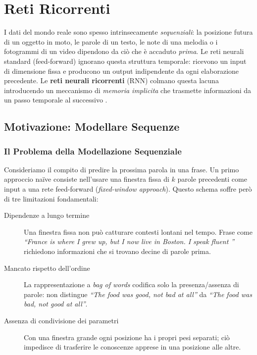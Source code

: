\chapter{Reti Ricorrenti}
\label{ch:recurrent-networks}

I dati del mondo reale sono spesso intrinsecamente \emph{sequenziali}: la
posizione futura di un oggetto in moto, le parole di un testo, le note di una
melodia o i fotogrammi di un video dipendono da ciò che è accaduto
\emph{prima}. Le reti neurali standard (feed-forward) ignorano questa struttura
temporale: ricevono un input di dimensione fissa e producono un output
indipendente da ogni elaborazione precedente. Le \textbf{reti neurali
ricorrenti} (RNN) colmano questa lacuna introducendo un meccanismo di
\emph{memoria implicita} che trasmette informazioni da un passo temporale al
successivo \citep{bishop2024}.

\section{Motivazione: Modellare Sequenze}
\label{sec:rnn-motivation}

\subsection{Il Problema della Modellazione Sequenziale}
\label{subsec:seq-problem}

Consideriamo il compito di predire la prossima parola in una frase. Un primo
approccio naïve consiste nell'usare una finestra fissa di $k$ parole precedenti
come input a una rete feed-forward (\emph{fixed-window approach}). Questo schema
soffre però di tre limitazioni fondamentali:

\begin{description}
  \item[Dipendenze a lungo termine] Una finestra fissa non può catturare
        contesti lontani nel tempo. Frase come \emph{``France is where I grew
        up, but I now live in Boston. I speak fluent \underline{\hspace{1cm}}''}
        richiedono informazioni che si trovano decine di parole prima.
  \item[Mancato rispetto dell'ordine] La rappresentazione a \emph{bag of words}
        codifica solo la presenza/assenza di parole: non distingue \emph{``The
        food was good, not bad at all''} da \emph{``The food was bad, not good
        at all''}.
  \item[Assenza di condivisione dei parametri] Con una finestra grande ogni
        posizione ha i propri pesi separati; ciò impedisce di trasferire le
        conoscenze apprese in una posizione alle altre.
\end{description}

